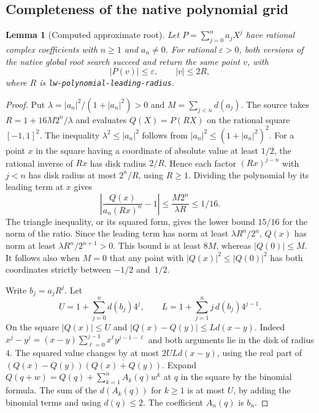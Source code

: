 \documentclass[11pt]{amsart}
\newtheorem{lemma}[theorem]{Lemma}
\theoremstyle{definition}
\theoremstyle{remark}
\numberwithin{equation}{section}
\newcommand{\code}[1]{\nolinkurl{#1}}
\begin{document}
\subsection{Completeness of the native polynomial grid}

\begin{lemma}[Computed approximate root]\label{lem:native-poly-root}
Let $P=\sum_{j=0}^n a_j X^j$ have rational complex
coefficients with $n\ge1$ and $a_n\ne0$. For rational
$\varepsilon>0$, both versions of the native global root
search succeed and return the same point $v$, with
\[
     |P(v)|\le\varepsilon,\qquad |v|\le 2R ,
\]
where $R$ is \code{lw-polynomial-leading-radius}.
\end{lemma}
\begin{proof}
Put $\lambda=|a_n|^2/(1+|a_n|^2)>0$ and
$M=\sum_{j<n}d(a_j)$. The source takes
$R=1+16M2^n/\lambda$ and evaluates $Q(X)=P(RX)$ on
the rational square $[-1,1]^2$. The inequality
$\lambda^2\le |a_n|^2$ follows from
$|a_n|^2\le(1+|a_n|^2)^2$.
For a point $x$ in the square having a coordinate of absolute
value at least $1/2$, the rational inverse of $Rx$ has disk
radius $2/R$. Hence each factor $(Rx)^{j-n}$ with $j<n$
has disk radius at most $2^n/R$, using $R\ge1$.
Dividing the polynomial by its leading term at $x$ gives
\[
  \left|\frac{Q(x)}{a_n(Rx)^n}-1\right|
       \le \frac{M2^n}{\lambda R}\le 1/16.
\]
The triangle inequality, or its squared form, gives the
lower bound $15/16$ for the norm of the ratio.
Since the leading term has norm at least $\lambda R^n/2^n$,
$Q(x)$ has norm at least $\lambda R^n/2^{n+1}>0$.
This bound is at least $8M$, whereas $|Q(0)|\le M$.
It follows also when $M=0$ that any point with
$|Q(x)|^2\le |Q(0)|^2$ has both coordinates strictly
between $-1/2$ and~$1/2$.

Write $b_j=a_j R^j$. Let
\[
 U=1+\sum_{j=0}^n d(b_j)4^j,\qquad
 L=1+\sum_{j=1}^n j\,d(b_j)4^{j-1}.
\]
On the square $|Q(x)|\le U$ and
$|Q(x)-Q(y)|\le Ld(x-y)$. Indeed
$x^j-y^j=(x-y)\sum_{\ell=0}^{j-1}x^\ell y^{j-1-\ell}$
and both arguments lie in the disk of radius $4$.
The squared value changes by at most $2ULd(x-y)$,
using the real part of $(Q(x)-Q(y))\overline{(Q(x)+Q(y))}$.
Expand $Q(q+w)=Q(q)+\sum_{k=1}^n A_k(q)w^k$
at $q$ in the square by the binomial formula.
The sum of the $d(A_k(q))$ for $k\ge1$ is at most $U$,
by adding the binomial terms and using $d(q)\le2$.
The coefficient $A_n(q)$ is $b_n$.


\end{proof}
\end{document}
